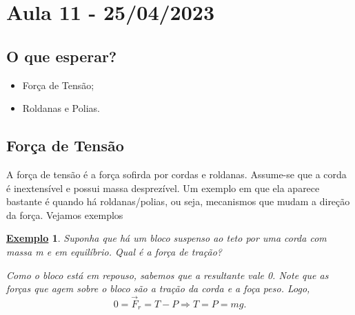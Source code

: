 \documentclass{article}
\newtheorem{example}{\underline{Exemplo}}
\begin{document}
\section{Aula 11 - 25/04/2023}
\subsection{O que esperar?}
\begin{itemize}
  \item For\c ca de Tens\~ao;
  \item Roldanas e Polias.
\end{itemize}

\subsection{For\c ca de Tens\~ao}
  A for\c ca de tens\~ao \'e a for\c ca sofirda por cordas e roldanas. Assume-se que a corda \'e inextens\'ivel e possui massa 
  desprez\'ivel. Um exemplo em que ela aparece bastante \'e quando h\'a roldanas/polias, ou seja, mecanismos que mudam a dire\c c\~ao
  da for\c ca. Vejamos exemplos
 \begin{example}
   Suponha que h\'a um bloco suspenso ao teto por uma corda com massa m e em equil\'ibrio. Qual \'e a for\c ca de tra\c c\~ao?

   Como o bloco est\'a em repouso, sabemos que a resultante vale 0. Note que as for\c cas que agem sobre o bloco s\~ao a tra\c c\~ao
   da corda e a fo\c ca peso. Logo, 
     $$
       0 = \vec{F}_{r} = T - P \Rightarrow T = P = mg.
     $$
 \end{example}
\end{document}
